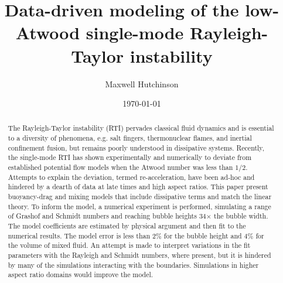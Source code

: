 \documentclass[twocolumn,showpacs,preprintnumbers,amsmath,amssymb,floatfix]{revtex4-1}
\begin{document}
\title{Data-driven modeling of the low-Atwood single-mode Rayleigh-Taylor instability}

\author{Maxwell Hutchinson}

\date{\today}

\begin{abstract}
The Rayleigh-Taylor instability (RTI) pervades classical fluid dynamics and is essential to a diversity of phenomena, e.g. salt fingers, thermonuclear flames, and inertial confinement fusion, but remains poorly understood in dissipative systems.
Recently, the single-mode RTI has shown experimentally and numerically to deviate from established potential flow models when the Atwood number was less than $1/2$.
Attempts to explain the deviation, termed re-acceleration, have been ad-hoc and hindered by a dearth of data at late times and high aspect ratios.
This paper present buoyancy-drag and mixing models that include dissipative terms and match the linear theory.
To inform the model, a numerical experiment is performed, simulating a range of Grashof and Schmidt numbers and reaching bubble heights 34$\times$ the bubble width.
The model coefficients are estimated by physical argument and then fit to the numerical results.
The model error is less than 2\% for the bubble height and 4\% for the volume of mixed fluid.
An attempt is made to interpret variations in the fit parameters with the Rayleigh and Schmidt numbers, where present, but it is hindered by many of the simulations interacting with the boundaries.
Simulations in higher aspect ratio domains would improve the model.
\end{abstract}

\pacs{}
\maketitle




\end{document}
